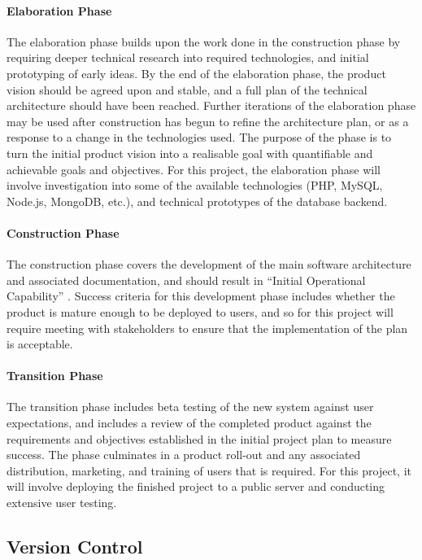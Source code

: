 \paragraph{Elaboration Phase} The elaboration phase builds upon the work done in
the construction phase by requiring deeper technical research into required
technologies, and initial prototyping of early ideas. By the end of the
elaboration phase, the product vision should be agreed upon and stable, and a
full plan of the technical architecture should have been reached.  Further
iterations of the elaboration phase may be used after construction has begun to
refine the architecture plan, or as a response to a change in the technologies
used. The purpose of the phase is to turn the initial product vision into a
realisable goal with quantifiable and achievable goals and objectives. For this
project, the elaboration phase will involve investigation into some of the
available technologies (PHP, MySQL, Node.js, MongoDB, etc.), and technical
prototypes of the database backend.

\paragraph{Construction Phase} The construction phase covers the development of
the main software architecture and associated documentation, and should result
in ``Initial Operational Capability'' \cite{Rational2011}. Success criteria for
this development phase includes whether the product is mature enough to be
deployed to users, and so for this project will require meeting with
stakeholders to ensure that the implementation of the plan is acceptable.

\paragraph{Transition Phase} The transition phase includes beta testing of the
new system against user expectations, and includes a review of the completed
product against the requirements and objectives established in the initial
project plan to measure success. The phase culminates in a product roll-out and
any associated distribution, marketing, and training of users that is
required. For this project, it will involve deploying the finished project to a
public server and conducting extensive user testing.

\subsection{Version Control}

